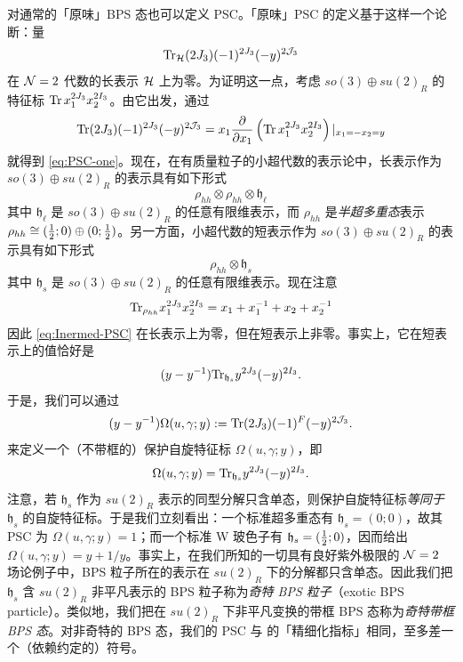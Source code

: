 对通常的「原味」BPS 态也可以定义 PSC。「原味」PSC 的定义基于这样一个论断：量
\begin{equation}\label{eq:PSC-one}
{\rm Tr}_{\mathcal{H}}(2 J_3) (-1)^{2J_3} (-y)^{2\mathcal{J}_3}
\end{equation}
在 $\mathcal{N}=2$ 代数的长表示 $\mathcal{H}$ 上为零。为证明这一点，考虑 $so(3)\oplus su(2)_R$ 的特征标 ${\rm Tr}\, x_1^{2J_3} x_2^{2I_3}$。由它出发，通过
\begin{equation}\label{eq:Inermed-PSC}
{\rm Tr}(2 J_3) (-1)^{2J_3} (-y)^{2\mathcal{J}_3} = x_1\frac{\partial}{\partial x_1}\left({\rm Tr}\, x_1^{2J_3} x_2^{2I_3}\right)\vert_{x_1=-x_2 = y}
\end{equation}
就得到 \eqref{eq:PSC-one}。现在，在有质量粒子的小超代数的表示论中，长表示作为 $so(3)\oplus su(2)_R$ 的表示具有如下形式
\begin{equation}
\rho_{hh}\otimes \rho_{hh}\otimes \mathfrak{h}_{\ell}
\end{equation}
其中 $\mathfrak{h}_{\ell}$ 是 $so(3)\oplus su(2)_R$ 的任意有限维表示，而 $\rho_{hh}$ 是\emph{半超多重态}表示 $\rho_{hh}\cong (\tfrac{1}{2};0) \oplus (0;\tfrac{1}{2})$。另一方面，小超代数的短表示作为 $so(3)\oplus su(2)_R$ 的表示具有如下形式
\begin{equation}
\rho_{hh} \otimes \mathfrak{h}_{s}
\end{equation}
其中 $\mathfrak{h}_{s}$ 是 $so(3)\oplus su(2)_R$ 的任意有限维表示。现在注意
\begin{equation}
{\rm Tr}_{\rho_{hh}}  x_1^{2J_3} x_2^{2I_3} = x_1 + x_1^{-1} + x_2 + x_2^{-1}
\end{equation}
因此 \eqref{eq:Inermed-PSC} 在长表示上为零，但在短表示上非零。事实上，它在短表示上的值恰好是
\begin{equation}
(y- y^{-1}) {\rm Tr}_{\mathfrak{h}_s} y^{2J_3} (-y)^{2I_3} .
\end{equation}
于是，我们可以通过
\begin{equation}
(y- y^{-1}) \Omega(u,\gamma;y) := {\rm Tr}(2 J_3) (-1)^F (-y)^{2\mathcal{J}_3}.
\end{equation}
来定义一个（不带框的）保护自旋特征标 $\Omega(u,\gamma;y)$，即
\begin{equation}
\Omega(u,\gamma;y) = {\rm Tr}_{\mathfrak{h}_s} y^{2J_3} (-y)^{2I_3} .
\end{equation}
注意，若 $\mathfrak{h}_s$ 作为 $su(2)_R$ 表示的同型分解只含单态，则保护自旋特征标\emph{等同于} $\mathfrak{h}_s$ 的自旋特征标。于是我们立刻看出：一个标准超多重态有 $\mathfrak{h}_s = (0;0)$，故其 PSC 为 $\Omega(u,\gamma;y)=1$；而一个标准 W 玻色子有 $\mathfrak{h}_s= (\tfrac{1}{2};0)$，因而给出 $\Omega(u,\gamma;y)=y+1/y$。事实上，在我们所知的一切具有良好紫外极限的 $\mathcal{N}=2$ 场论例子中，BPS 粒子所在的表示在 $su(2)_R$ 下的分解都只含单态。因此我们把 $\mathfrak{h}_s$ 含 $su(2)_R$ 非平凡表示的 BPS 粒子称为\emph{奇特 BPS 粒子}（exotic BPS particle）。类似地，我们把在 $su(2)_R$ 下非平凡变换的带框 BPS 态称为\emph{奇特带框 BPS 态}。对非奇特的 BPS 态，我们的 PSC 与 \cite{Gukov:2004hz,Dimofte:2009bv,Dimofte:2009tm} 的「精细化指标」相同，至多差一个（依赖约定的）符号。

